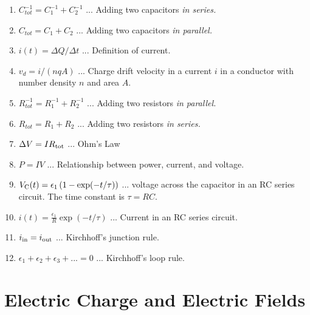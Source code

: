 \documentclass[10pt]{article}
\begin{document}
\begin{enumerate}
\item $C_{tot}^{-1} = C_1^{-1} + C_2^{-1}$ ... Adding two capacitors \textit{in series.}
\item $C_{tot} = C_1 + C_2$ ... Adding two capacitors \textit{in parallel.}
\item $i(t) = \Delta Q/\Delta t$ ... Definition of current.
\item $v_d = i/(nqA)$ ... Charge drift velocity in a current $i$ in a conductor with number density $n$ and area $A$.
\item $R_{tot}^{-1} = R_1^{-1} + R_2^{-1}$ ... Adding two resistors \textit{in parallel.}
\item $R_{tot} = R_1 + R_2$ ... Adding two resistors \textit{in series.}
\item $\Delta V = I R_{\rm tot}$ ... Ohm's Law
\item $P = I V$ ... Relationship between power, current, and voltage.
\item $V_{\rm C}(t) = \epsilon_1 \left(1 - \exp(-t/\tau)\right)$ ... voltage across the capacitor in an RC series circuit.  The time constant is $\tau = RC$.
\item $i(t) = \frac{\epsilon_1}{R} \exp(-t/\tau)$ ... Current in an RC series circuit.
\item $i_{\rm in} = i_{\rm out}$ ... Kirchhoff's junction rule.
\item $\epsilon_1 + \epsilon_2 + \epsilon_3 + ... = 0$ ... Kirchhoff's loop rule.
\end{enumerate}

\clearpage

\section{Electric Charge and Electric Fields}
\end{document}
